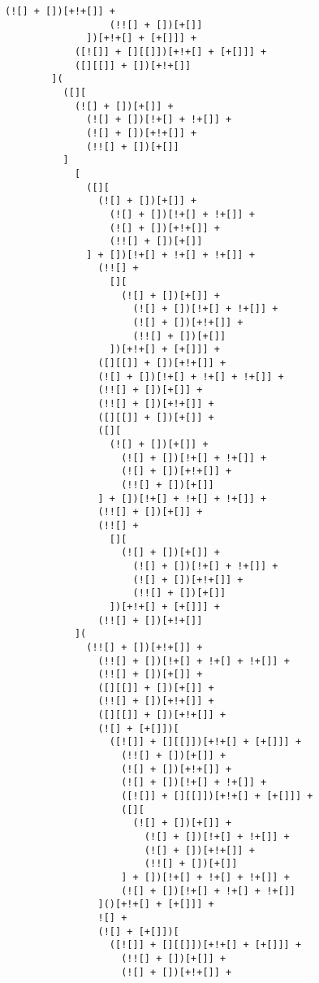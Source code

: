\begin{lstlisting}[style=basicStyle, caption=alert('XSS') in JSFuck, label={lst:alertxssjsfuck}]
                  (![] + [])[+!+[]] +
                  (!![] + [])[+[]]
              ])[+!+[] + [+[]]] +
            ([![]] + [][[]])[+!+[] + [+[]]] +
            ([][[]] + [])[+!+[]]
        ](
          ([][
            (![] + [])[+[]] +
              (![] + [])[!+[] + !+[]] +
              (![] + [])[+!+[]] +
              (!![] + [])[+[]]
          ]
            [
              ([][
                (![] + [])[+[]] +
                  (![] + [])[!+[] + !+[]] +
                  (![] + [])[+!+[]] +
                  (!![] + [])[+[]]
              ] + [])[!+[] + !+[] + !+[]] +
                (!![] +
                  [][
                    (![] + [])[+[]] +
                      (![] + [])[!+[] + !+[]] +
                      (![] + [])[+!+[]] +
                      (!![] + [])[+[]]
                  ])[+!+[] + [+[]]] +
                ([][[]] + [])[+!+[]] +
                (![] + [])[!+[] + !+[] + !+[]] +
                (!![] + [])[+[]] +
                (!![] + [])[+!+[]] +
                ([][[]] + [])[+[]] +
                ([][
                  (![] + [])[+[]] +
                    (![] + [])[!+[] + !+[]] +
                    (![] + [])[+!+[]] +
                    (!![] + [])[+[]]
                ] + [])[!+[] + !+[] + !+[]] +
                (!![] + [])[+[]] +
                (!![] +
                  [][
                    (![] + [])[+[]] +
                      (![] + [])[!+[] + !+[]] +
                      (![] + [])[+!+[]] +
                      (!![] + [])[+[]]
                  ])[+!+[] + [+[]]] +
                (!![] + [])[+!+[]]
            ](
              (!![] + [])[+!+[]] +
                (!![] + [])[!+[] + !+[] + !+[]] +
                (!![] + [])[+[]] +
                ([][[]] + [])[+[]] +
                (!![] + [])[+!+[]] +
                ([][[]] + [])[+!+[]] +
                (![] + [+[]])[
                  ([![]] + [][[]])[+!+[] + [+[]]] +
                    (!![] + [])[+[]] +
                    (![] + [])[+!+[]] +
                    (![] + [])[!+[] + !+[]] +
                    ([![]] + [][[]])[+!+[] + [+[]]] +
                    ([][
                      (![] + [])[+[]] +
                        (![] + [])[!+[] + !+[]] +
                        (![] + [])[+!+[]] +
                        (!![] + [])[+[]]
                    ] + [])[!+[] + !+[] + !+[]] +
                    (![] + [])[!+[] + !+[] + !+[]]
                ]()[+!+[] + [+[]]] +
                ![] +
                (![] + [+[]])[
                  ([![]] + [][[]])[+!+[] + [+[]]] +
                    (!![] + [])[+[]] +
                    (![] + [])[+!+[]] +

\end{lstlisting}
